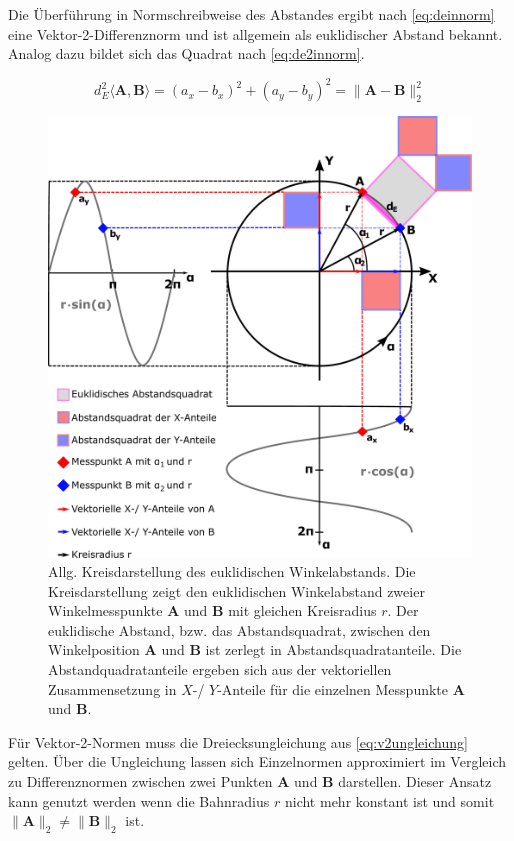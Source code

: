\clearpage


Die Überführung in Normschreibweise des Abstandes ergibt nach \autoref{eq:deinnorm} eine Vektor-2-Differenznorm und ist allgemein als euklidischer Abstand bekannt. Analog dazu bildet sich das Quadrat nach \autoref{eq:de2innorm}.


\begin{equation}\label{eq:de2innorm}
d_E^2\langle\mathbf{A},\mathbf{B}\rangle = (a_x - b_x)^2 + (a_y - b_y)^2 = \|\mathbf{A} - \mathbf{B}\|_2^2
\end{equation}

\vspace{5mm}
\begin{figure}[bph]
	\centering
	\includegraphics[width=0.7\linewidth]{chapters/images/2-Grundlagen/Kreisdarstellung_Winkelabstand}
	\caption[Allg. Kreisdarstellung des euklidischen Winkelabstands]{Allg. Kreisdarstellung des euklidischen 
		Winkelabstands. Die Kreisdarstellung zeigt den euklidischen Winkelabstand zweier Winkelmesspunkte $\mathbf{A}$ 
		und $\mathbf{B}$ mit gleichen Kreisradius $r$. Der euklidische Abstand, bzw. das Abstandsquadrat, zwischen den 
		Winkelposition $\mathbf{A}$ und $\mathbf{B}$ ist zerlegt in Abstandsquadratanteile. Die Abstandquadratanteile 
		ergeben sich aus der vektoriellen Zusammensetzung in $X$-/ $Y$-Anteile für die einzelnen Messpunkte 
		$\mathbf{A}$ und $\mathbf{B}$.}
	\label{fig:kreisdarstellungwinkelabstand}
\end{figure}


\clearpage


Für Vektor-2-Normen muss die Dreiecksungleichung aus \autoref{eq:v2ungleichung} \cite{vandeGeijn2014} gelten. Über die Ungleichung lassen sich Einzelnormen approximiert im Vergleich zu Differenznormen zwischen zwei Punkten $\mathbf{A}$ und $\mathbf{B}$ darstellen. Dieser Ansatz kann genutzt werden wenn die Bahnradius $r$ nicht mehr konstant ist und somit
$\|\mathbf{A}\|_2 \ne \|\mathbf{B}\|_2$ ist.


